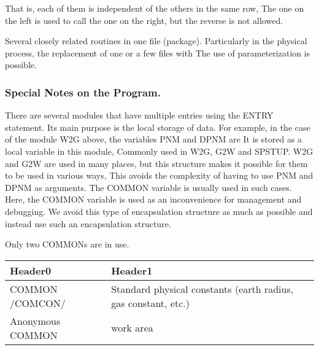 That is, each of them is independent of the others in the same row, The
one on the left is used to call the one on the right, but the reverse is
not allowed.

Several closely related routines in one file (package). Particularly in
the physical process, the replacement of one or a few files with The use
of parameterization is possible.

\hypertarget{special-notes-on-the-program.}{%
\subsubsection{Special Notes on the
Program.}\label{special-notes-on-the-program.}}

There are several modules that have multiple entries using the ENTRY
statement. Its main purpose is the local storage of data. For example,
in the case of the module W2G above, the variables PNM and DPNM are It
is stored as a local variable in this module, Commonly used in W2G, G2W
and SPSTUP. W2G and G2W are used in many places, but this structure
makes it possible for them to be used in various ways, This avoids the
complexity of having to use PNM and DPNM as arguments. The COMMON
variable is usually used in such cases. Here, the COMMON variable is
used as an inconvenience for management and debugging. We avoid this
type of encapsulation structure as much as possible and instead use such
an encapsulation structure.

Only two COMMONs are in use.

\begin{longtable}[]{@{}ll@{}}
\toprule
\begin{minipage}[b]{0.47\columnwidth}\raggedright
Header0\strut
\end{minipage} & \begin{minipage}[b]{0.47\columnwidth}\raggedright
Header1\strut
\end{minipage}\tabularnewline
\midrule
\endhead
\begin{minipage}[t]{0.47\columnwidth}\raggedright
COMMON /COMCON/\strut
\end{minipage} & \begin{minipage}[t]{0.47\columnwidth}\raggedright
Standard physical constants (earth radius, gas constant, etc.)\strut
\end{minipage}\tabularnewline
\begin{minipage}[t]{0.47\columnwidth}\raggedright
Anonymous COMMON\strut
\end{minipage} & \begin{minipage}[t]{0.47\columnwidth}\raggedright
work area\strut
\end{minipage}\tabularnewline
\bottomrule
\end{longtable}

